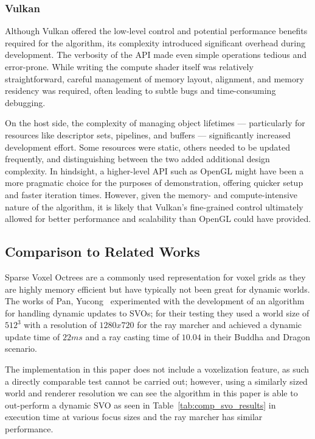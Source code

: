 \subsubsection{Vulkan}
Although Vulkan offered the low-level control and potential performance benefits required for the algorithm, its
complexity introduced significant overhead during development. The verbosity of the API made even simple operations
tedious and error-prone. While writing the compute shader itself was relatively straightforward, careful management of
memory layout, alignment, and memory residency was required, often leading to subtle bugs and time-consuming debugging.

On the host side, the complexity of managing object lifetimes — particularly for resources like descriptor sets,
pipelines, and buffers — significantly increased development effort. Some resources were static, others needed to be
updated frequently, and distinguishing between the two added additional design complexity. In hindsight, a higher-level
API such as OpenGL might have been a more pragmatic choice for the purposes of demonstration, offering quicker setup and
faster iteration times. However, given the memory- and compute-intensive nature of the algorithm, it is likely that
Vulkan's fine-grained control ultimately allowed for better performance and scalability than OpenGL could have provided.

\subsection{Comparison to Related Works}
Sparse Voxel Octrees are a commonly used representation for voxel grids as they are highly memory efficient but have
typically not been great for dynamic worlds. The works of Pan, Yucong~\cite{pan2021dynamic} experimented with the
development of an algorithm for handling dynamic updates to SVOs; for their testing they used a world size of $512^3$
with a resolution of $1280x720$ for the ray marcher and achieved a dynamic update time of $22ms$ and a ray casting time
of $10.04$ in their Buddha and Dragon scenario.

The implementation in this paper does not include a voxelization feature, as such a directly comparable test cannot be
carried out; however, using a similarly sized world and renderer resolution we can see the algorithm in this paper is
able to out-perform a dynamic SVO as seen in Table~\ref{tab:comp_svo_results} in execution time at various focus sizes and
the ray marcher has similar performance.

